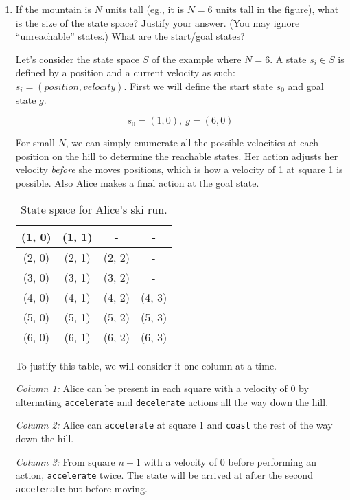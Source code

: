 \documentclass[fleqn]{hermans-hw}
\begin{document}
\begin{enumerate}
\item If the mountain is $N$ units tall (eg., it is $N=6$ units tall in
the figure), what is the size of the state space?  Justify your
answer.  (You may ignore ``unreachable'' states.)  What are the
start/goal states?

Let's consider the state space $S$ of the example where $N = 6$. A state $s_i \in S$ is defined by a position and a current velocity as such: $s_i = (position, velocity)$. First we will define the start state $s_0$ and goal state $g$.

$$s_0 = (1, 0), \ g = (6, 0)$$

For small $N$, we can simply enumerate all the possible velocities at each position on the hill to determine the reachable states. Her action adjusts her velocity \textit{before} she moves positions, which is how a velocity of 1 at square 1 is possible. Also Alice makes a final action at the goal state.

\begin{table}[H]
\centering
{\renewcommand{\arraystretch}{1.2}%
\begin{tabular}{| c | c | c | c |}
\hline
(1, 0) & (1, 1) & - & - \\ \hline
(2, 0) & (2, 1) & (2, 2) & - \\ \hline
(3, 0) & (3, 1) & (3, 2) & - \\ \hline
(4, 0) & (4, 1) & (4, 2) & (4, 3) \\ \hline
(5, 0) & (5, 1) & (5, 2) & (5, 3) \\ \hline
(6, 0) & (6, 1) & (6, 2) & (6, 3) \\ \hline
\end{tabular}}
\caption{State space for Alice's ski run.}
\end{table}

To justify this table, we will consider it one column at a time. 

\textit{Column 1:} Alice can be present in each square with a velocity of 0 by alternating \texttt{accelerate} and \texttt{decelerate} actions all the way down the hill.

\textit{Column 2:} Alice can \texttt{accelerate} at square 1 and \texttt{coast} the rest of the way down the hill.

\textit{Column 3:} From square $n - 1$ with a velocity of 0 before performing an action, \texttt{accelerate} twice. The state will be arrived at after the second \texttt{accelerate} but before moving.


\end{enumerate}
\end{document}

